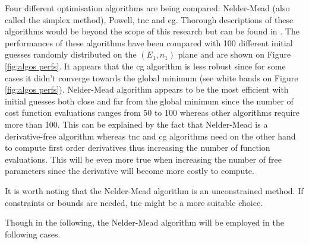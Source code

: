 Four different optimisation algorithms are being compared: 
Nelder-Mead (also called the simplex method), Powell, \gls{tnc} and \gls{cg}.
Thorough descriptions of these algorithms would be beyond the scope of this research but can be found in .
The performances of these algorithms have been compared with 100 different initial guesses randomly distributed on the $(E_1,n_1)$ plane and are shown on Figure \ref{fig:algos perfs}.
It appears that the \gls{cg} algorithm is less robust since for some cases it didn't converge towards the global minimum (see white bands on Figure \ref{fig:algos perfs}).
Nelder-Mead algorithm appears to be the most efficient with initial guesses both close and far from the global minimum since the number of cost function evaluations ranges from 50 to 100 whereas other algorithms require more than 100.
This can be explained by the fact that Nelder-Mead is a derivative-free algorithm whereas \gls{tnc} and \gls{cg} algorithms need on the other hand to compute first order derivatives thus increasing the number of function evaluations.
This will be even more true when increasing the number of free parameters since the derivative will become more costly to compute.

It is worth noting that the Nelder-Mead algorithm is an unconstrained method.
If constraints or bounds are needed, \gls{tnc} might be a more suitable choice.

Though in the following, the Nelder-Mead algorithm will be employed in the following cases.
